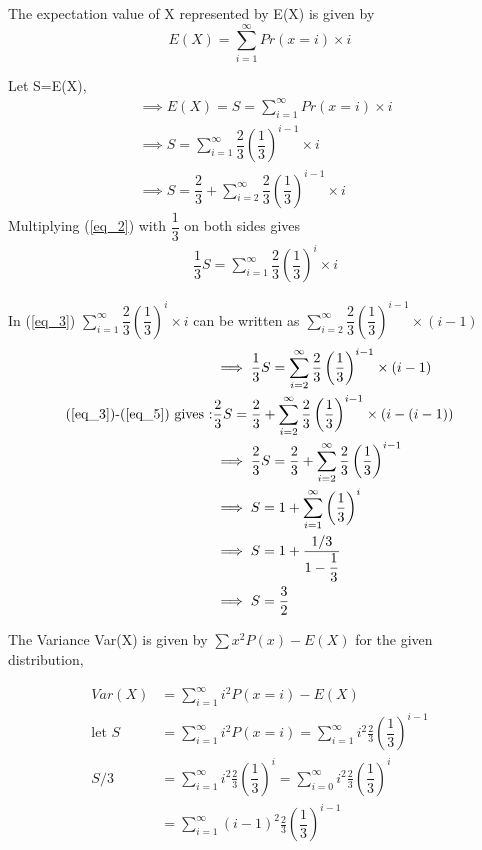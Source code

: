 \documentclass[a4paper]{article}
\begin{document}
\begin{multicols*}{2}
The expectation value of X represented by E(X) is given by
$$E(X)=\sum_{i=1}^{\infty} Pr(x=i)\times i$$

Let S=E(X),
\begin{align}
&\implies E(X)=S=\sum_{i=1}^{\infty} Pr(x=i)\times i\\
&\implies S=\sum_{i=1}^{\infty} \dfrac{2}{3}\left(\dfrac{1}{3}\right)^{i-1} \times i \label{eq_2}   \\
&\implies S=\dfrac{2}{3}+\sum_{i=2}^{\infty} \dfrac{2}{3}\left(\dfrac{1}{3}\right)^{i-1} \times i  \label{eq_3}
\end{align}
Multiplying (\ref{eq_2}) with  $\dfrac{1}{3}$ on both sides gives
\begin{align}
&\dfrac{1}{3}S=\sum_{i=1}^{\infty} \dfrac{2}{3}\left(\dfrac{1}{3}\right)^{i} \times i \label{eq_4}
\end{align}

In (\ref{eq_3})	$\sum_{i=1}^{\infty} \dfrac{2}{3}\left(\dfrac{1}{3}\right)^{i} \times i$ can be written as $\sum_{i=2}^{\infty} \dfrac{2}{3}\left(\dfrac{1}{3}\right)^{i-1} \times (i-1)$
\begin{align}
& \implies \dfrac{1}{3}S=\sum_{i=2}^{\infty} \dfrac{2}{3}\left(\dfrac{1}{3}\right)^{i-1} \times (i-1) \label{eq_5} \\
\text{(\ref{eq_3})-(\ref{eq_5}) gives :}& \dfrac{2}{3}S=\dfrac{2}{3}+\sum_{i=2}^{\infty} \dfrac{2}{3}\left(\dfrac{1}{3}\right)^{i-1} \times (i-(i-1))\\
&\implies  \dfrac{2}{3}S=\dfrac{2}{3}+\sum_{i=2}^{\infty} \dfrac{2}{3}\left(\dfrac{1}{3}\right)^{i-1}\\
& \implies S=1+\sum_{i=1}^{\infty}\left(\dfrac{1}{3}\right)^{i}\\
& \implies S=1+\dfrac{1/3}{1-\dfrac{1}{3}}\\
& \implies S=\dfrac{3}{2} \label{eq_10}
\end{align}

The Variance Var(X) is given by $\sum x^2 P(x) - E(X)$ for the given distribution,

\begin{align}
Var(X) & =\sum_{i=1}^{\infty} i^2P(x=i) - E(X)\label{eq_11}\\
\text{let } S & = \sum_{i=1}^{\infty} i^2P(x=i)=\sum_{i=1}^{\infty} i^2 \frac{2}{3}\left(\dfrac{1}{3}\right)^{i-1} \label{eq_12}\\
S/3&= \sum_{i=1}^{\infty} i^2 \frac{2}{3}\left(\dfrac{1}{3}\right)^{i}=\sum_{i=0}^{\infty} i^2 \frac{2}{3}\left(\dfrac{1}{3}\right)^{i}\\
& = \sum_{i=1}^{\infty} (i-1)^2 \frac{2}{3}\left(\dfrac{1}{3}\right)^{i-1}\label{eq_14}
\end{align}


\end{multicols*}
\end{document}
